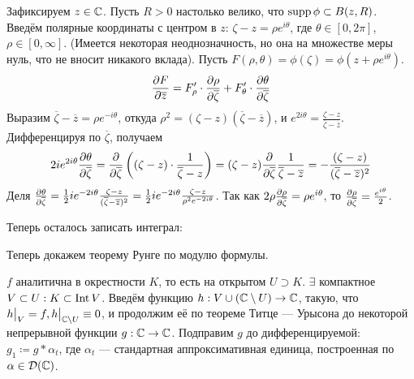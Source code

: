 \documentclass[a4paper]{report}
\begin{document}
{{{            Зафиксируем $z \in \mathbb{C}$.
            Пусть $R > 0$ настолько велико, что $\operatorname{supp} \phi \subset B(z, R)$.
            Введём полярные координаты с центром в $z$: $\zeta - z = \rho e^{i\theta}$, где $\theta \in [0, 2\pi]$, $\rho \in [0, \infty]$.
            (Имеется некоторая неоднозначность, но она на множестве меры нуль, что не вносит никакого вклада).
        Пусть $F(\rho, \theta) = \phi(\zeta) = \phi(z + \rho e^{i\theta})$.
        \[\frac{\partial F}{\partial \overline{z}} = F'_\rho \cdot \frac{\partial \rho}{\partial \overline{\zeta}} + F'_\theta \cdot \frac{\partial \theta}{\partial \overline{\zeta}}\]
        Выразим $\overline{\zeta} - \overline{z} = \rho e^{-i\theta}$, откуда $\rho^2 = (\zeta - z)(\overline{\zeta} - \overline{z})$, и $e^{2i\theta} = \frac{\zeta - z}{\overline{\zeta} - \overline{z}}$.
        Дифференцируя по $\overline{\zeta}$, получаем \[2i e^{2i\theta}\frac{\partial \theta}{\partial \overline{\zeta}} = \frac{\partial }{\partial \overline{\zeta}}\left((\zeta - z) \cdot \frac{1}{\overline{\zeta} - z}\right) = (\zeta - z)\frac{\partial }{\partial \overline{\zeta}}\frac{1}{\overline{\zeta} - \overline{z}} = -\frac{(\zeta - z)}{(\overline{\zeta} - \overline{z})^2}\]
        Деля $\frac{\partial \theta}{\partial \overline{\zeta}} = \frac{1}{2}i e^{-2i\theta} \frac{\zeta - z}{(\overline{\zeta} - \overline{z})^2} = \frac{1}{2}i e^{-2i \theta} \frac{\zeta - z}{\rho^2 e^{-2i \theta}}$.
        Так как $2\rho \frac{\partial \rho}{\partial \overline{\zeta}} = \rho e^{i\theta}$, то $\frac{\partial \rho}{\partial \overline{\zeta}} = \frac{e^{i\theta}}{2}$.

        Теперь осталось записать интеграл:

        }


    Теперь докажем теорему Рунге по модулю формулы.

    $f$ аналитична в окрестности $K$, то есть на открытом $U \supset K$.
    $\exists$ компактное $V \subset U: K \subset \operatorname{Int} V$.
    Введём функцию $h: V \cup (\mathbb{C} \setminus U) \rightarrow \mathbb{C}$, такую, что $h\big|_{V} = f, h\big|_{\mathbb{C} \setminus U} \equiv 0$, и продолжим её по теореме Титце --- Урысона до некоторой непрерывной функции $g: \mathbb{C} \rightarrow \mathbb{C}$.
    Подправим $g$ до дифференцируемой: $g_1 \coloneqq g * \alpha_t$, где $\alpha_t$ --- стандартная аппроксимативная единица, построенная по $\alpha \in \mathcal{D}(\mathbb{C})$.

}}
\end{document}
